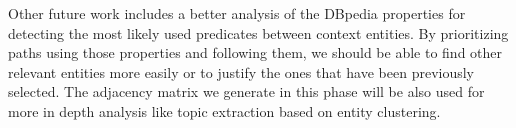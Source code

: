 \documentclass[a4paper,11pt]{report}
\begin{document}
Other future work includes a better analysis of the DBpedia properties for detecting the most likely used predicates between context entities. By prioritizing paths using those properties and following them, we should be able to find other relevant entities more easily or to justify the ones that have been previously selected. The adjacency matrix we generate in this phase will be also used for more in depth analysis like topic extraction based on entity clustering. 

%
\end{document}
